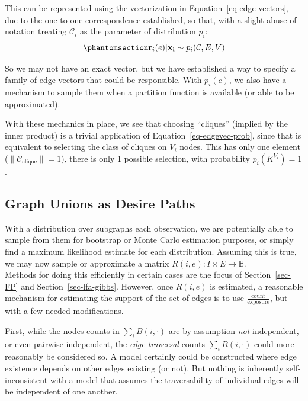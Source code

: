 \documentclass[%
	12pt,
		oneside,
		letterpaper
]{book}
\begin{document}
This can be represented using the vectorization in Equation~\ref{eq-edge-vectors}, due to the one-to-one correspondence established, so that, with a slight abuse of notation treating \(\mathcal{C}_i\) as the parameter of distribution \(p_i\):
\begin{equation}\phantomsection\label{eq-edgevec-prob}{
\mathbf{r}_{i}(e)|\mathbf{x_i} \sim p_i(\mathcal{C},E,V)
}\end{equation}

So we may not have an exact vector, but we have established a way to specify a family of edge vectors that could be responsible.
With \(p_i(c)\), we also have a mechanism to sample them when a partition function is available (or able to be approximated).

With these mechanics in place, we see that choosing ``cliques'' (implied by the inner product) is a trivial application of Equation~\ref{eq-edgevec-prob}, since that is equivalent to selecting the class of cliques on \(V_i\) nodes.
This has only one element (\(\|\mathcal{C}_{\text{clique}}\|=1\)), there is only 1 possible selection, with probability \(p_i(K^{V_i})=1\).

\subsection{Graph Unions as Desire Paths}\label{graph-unions-as-desire-paths}

With a distribution over subgraphs each observation, we are potentially able to sample from them for bootstrap or Monte Carlo estimation purposes, or simply find a maximum likelihood estimate for each distribution.
Assuming this is true, we may now sample or approximate a matrix \(R(i,e):I\times E \rightarrow \mathbb{B}\).\\
Methods for doing this efficiently in certain cases are the focus of Section~\ref{sec-FP} and Section~\ref{sec-lfa-gibbs}.
However, once \(R(i,e)\) is estimated, a reasonable mechanism for estimating the support of the set of edges is to use \(\frac{\text{count}}{\text{exposure}}\), but with a few needed modifications.

First, while the nodes counts in \(\sum_i B(i,\cdot)\) are by assumption \emph{not} independent, or even pairwise independent, the \emph{edge traversal} counts \(\sum_i R(i,\cdot)\) could more reasonably be considered so.
A model certainly could be constructed where edge existence depends on other edges existing (or not).
But nothing is inherently self-inconsistent with a model that assumes the traversability of individual edges will be independent of one another.
\end{document}
